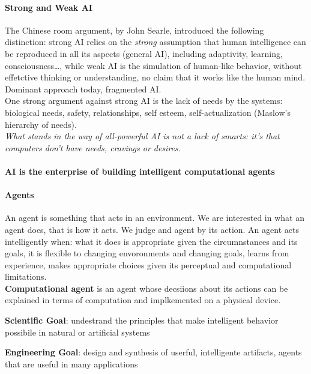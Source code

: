 \documentclass[10pt]{report}
\begin{document}
\paragraph{Strong and Weak AI} The Chinese room argument, by John Searle, introduced the following distinction: strong AI relies on the \textit{strong} assumption that human intelligence can be reproduced in all its aspects (general AI), including adaptivity, learning, consciousness\ldots, while weak AI is the simulation of human-like behavior, without effetctive thinking or understanding, no claim that it works like the human mind. Dominant approach today, fragmented AI.\\
One strong argument against strong AI is the lack of needs by the systems: biological needs, safety, relationships, self esteem, self-actualization (Maslow's hierarchy of needs).\\
\textit{What stands in the way of all-powerful AI is not a lack of smarts: it's that computers don't have needs, cravings or desires.}\\\\
\textbf{AI is the enterprise of building intelligent computational agents}
\paragraph{Agents} An agent is something that acts in an environment. We are interested in what an agent does, that is how it acts. We judge and agent by its action. An agent acts intelligently when: what it does is appropriate given the circumnstances and its goals, it is flexible to changing envoronments and changing goals, learns from experience, makes appropriate choices given its perceptual and computational limitations.\\
\textbf{Computational agent} is an agent whose decsiions about its actions can be explained in terms of computation and implkemented on a physical device.
\begin{list}{}{}
	\item \textbf{Scientific Goal}: undestrand the principles that make intelligent behavior possibile in natural or artificial systems
	\item \textbf{Engineering Goal}: design and synthesis of userful, intelligente artifacts, agents that are useful in many applications
\end{list}
\end{document}

